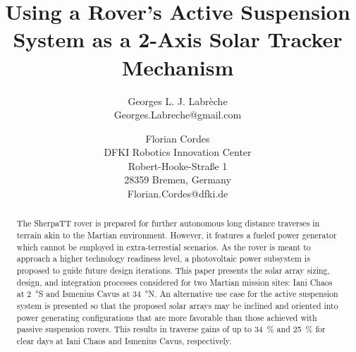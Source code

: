 \documentclass[twocolumn,letterpaper]{IEEEAerospaceCLS}  %
\begin{document}
\title{Using a Rover's Active Suspension System as a 2-Axis Solar Tracker Mechanism}

\author{%
Georges L. J. Labrèche\\
Georges.Labreche@gmail.com
\and
Florian Cordes\\
DFKI Robotics Innovation Center\\
Robert-Hooke-Straße 1\\
28359 Bremen, Germany\\
Florian.Cordes@dfki.de
}

\maketitle

\thispagestyle{plain}
\pagestyle{plain}


\begin{abstract}
The SherpaTT rover is prepared for further autonomous long distance traverses in terrain akin to the Martian environment. However, it features a fueled power generator which cannot be employed in extra-terrestial scenarios. As the rover is meant to approach a higher technology readiness level, a photovoltaic power subsystem is proposed to guide future design iterations. This paper presents the solar array sizing, design, and integration processes considered for two Martian mission sites: Iani Chaos at \SI{2}{\degree}S and Ismenius Cavus at \SI{34}{\degree}N. An alternative use case for the active suspension system is presented so that the proposed solar arrays may be inclined and oriented into power generating configurations that are more favorable than those achieved with passive suspension rovers. This results in traverse gains of up to \SI{34}{\percent} and \SI{25}{\percent} for clear days at Iani Chaos and Ismenius Cavus, respectively.
\end{abstract}
\end{document}

